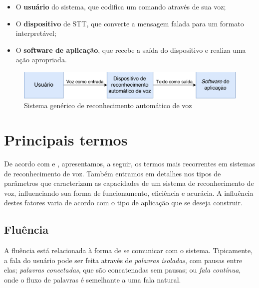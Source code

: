 \begin{itemize}
\item O \textbf{usuário} do sistema, que codifica um comando através de sua voz;

\item O \textbf{dispositivo} de STT, que converte a mensagem falada para um formato interpretável;

\item O \textbf{software de aplicação}, que recebe a saída do dispositivo e realiza uma ação apropriada.
\end{itemize}

\begin{figure}[H]
  \centering
  \includegraphics[width=.9\textwidth]{image/generic-stt.pdf}
  \caption{Sistema genérico de reconhecimento automático de voz \citep{sttComponentsParameters}}
  \label{generic-stt}
\end{figure}


\section{Principais termos}

De acordo com \citep{sttComponentsParameters} e \citep{sttBasics}, apresentamos, a seguir, os termos mais recorrentes em sistemas de reconhecimento de voz. Também entramos em detalhes nos tipos de parâmetros que caracterizam as capacidades de um sistema de reconhecimento de voz, influenciando sua forma de funcionamento, eficiência e acurácia. A influência destes fatores varia de acordo com o tipo de aplicação que se deseja construir.


\subsection{Fluência}

A fluência está relacionada à forma de se comunicar com o sistema. Tipicamente, a fala do usuário pode ser feita através de \emph{palavras isoladas}, com pausas entre elas; \emph{palavras conectadas}, que são concatenadas sem pausas; ou \emph{fala contínua}, onde o fluxo de palavras é semelhante a uma fala natural.

